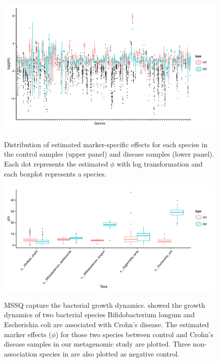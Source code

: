 \begin{figure}[p]
	\centering
	{\includegraphics[scale=0.6,trim=0 20 0 0,clip]{Figure/F33_Marker_Effect_Boxplot.pdf}
	}
	\caption[Distribution of estimated marker-specific effects]{Distribution of estimated marker-specific effects for each species in the control samples  (upper panel) and disease samples (lower panel). Each dot represents the estimated $\phi$ with log transformation and each boxplot represents a species.}
	\label{F33_Marker_Effect_Boxplot}
\end{figure}


\begin{figure}[p]
	\centering
	{\includegraphics[scale=0.55]{Figure/F36_Science_Five_Species.pdf}
	}
	\caption[MSSQ captures the bacterial growth dynamics]{MSSQ capture the bacterial growth dynamics. \citet{Korem:2015cv} showed the growth dynamics of two bacterial species Bifidobacterium longum and Escherichia coli are associated with Crohn's disease. The estimated marker effects ($\phi$) for those two species between control and Crohn's disease samples in our metagenomic study are plotted. Three non-association species in \citet{Korem:2015cv} are also plotted as negative control.}
	\label{F36_Science_Five_Species}
\end{figure}




